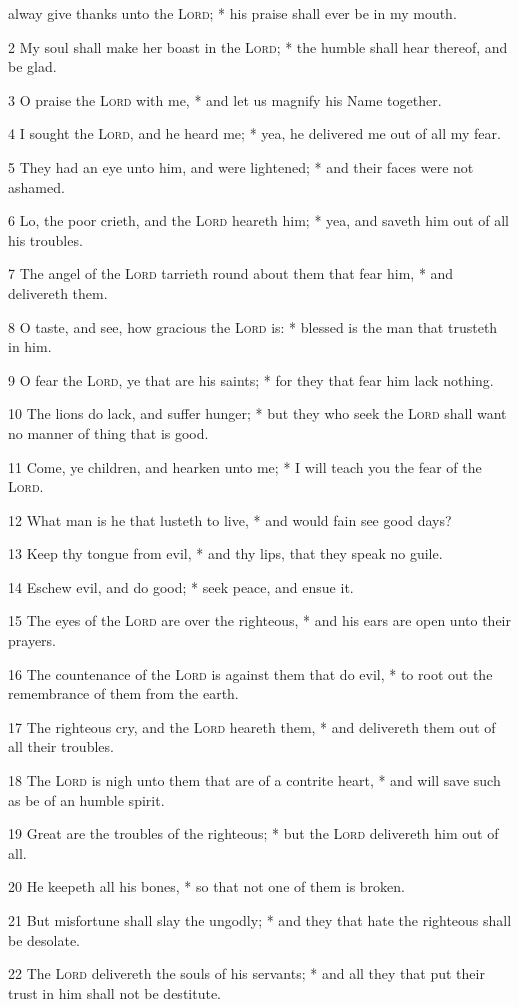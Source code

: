  alway give thanks unto the {\textsc{Lord}}; * his praise shall ever be in my mouth.\par
2 My soul shall make her boast in the {\textsc{Lord}}; * the humble shall hear thereof, and be glad.\par
3 O praise the {\textsc{Lord}} with me, * and let us magnify his Name together.\par
4 I sought the {\textsc{Lord}}, and he heard me; * yea, he delivered me out of all my fear.\par
5 They had an eye unto him, and were lightened; * and their faces were not ashamed.\par
6 Lo, the poor crieth, and the {\textsc{Lord}} heareth him; * yea, and saveth him out of all his troubles.\par
7 The angel of the {\textsc{Lord}} tarrieth round about them that fear him, * and delivereth them.\par
8 O taste, and see, how gracious the {\textsc{Lord}} is: * blessed is the man that trusteth in him.\par
9 O fear the {\textsc{Lord}}, ye that are his saints; * for they that fear him lack nothing.\par
10 The lions do lack, and suffer hunger; * but they who seek the {\textsc{Lord}} shall want no manner of thing that is good.\par
11 Come, ye children, and hearken unto me; * I will teach you the fear of the {\textsc{Lord}}.\par
12 What man is he that lusteth to live, * and would fain see good days?\par
13 Keep thy tongue from evil, * and thy lips, that they speak no guile.\par
14 Eschew evil, and do good; * seek peace, and ensue it.\par
15 The eyes of the {\textsc{Lord}} are over the righteous, * and his ears are open unto their prayers.\par
16 The countenance of the {\textsc{Lord}} is against them that do evil, * to root out the remembrance of them from the earth.\par
17 The righteous cry, and the {\textsc{Lord}} heareth them, * and delivereth them out of all their troubles.\par
18 The {\textsc{Lord}} is nigh unto them that are of a contrite heart, * and will save such as be of an humble spirit.\par
19 Great are the troubles of the righteous; * but the {\textsc{Lord}} delivereth him out of all.\par
20 He keepeth all his bones, * so that not one of them is broken.\par
21 But misfortune shall slay the ungodly; * and they that hate the righteous shall be desolate.\par
22 The {\textsc{Lord}} delivereth the souls of his servants; * and all they that put their trust in him shall not be destitute.
